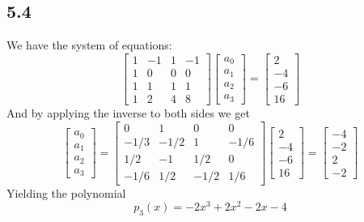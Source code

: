\documentclass[letterpaper,12pt]{article}
\theoremstyle{definition}
\begin{document}
\subsection*{5.4}
We have the system of equations:
\[
\begin{bmatrix}
    1 & -1 & 1 & -1 \\
    1 & 0 & 0 & 0 \\
    1 & 1 & 1 & 1 \\
    1 & 2 & 4 & 8
\end{bmatrix}
\begin{bmatrix}
    a_0 \\ a_1 \\ a_2 \\ a_3
\end{bmatrix}
=
\begin{bmatrix}
    2 \\ -4 \\ -6 \\ 16
\end{bmatrix}
\]
And by applying the inverse to both sides we get
\[
\begin{bmatrix}
    a_0 \\ a_1 \\ a_2 \\ a_3
\end{bmatrix}
=
\begin{bmatrix}
    0 & 1 & 0 & 0 \\
    -1/3 & -1/2 & 1 & -1/6 \\
    1/2 & -1 & 1/2 & 0 \\
    -1/6 & 1/2 & -1/2 & 1/6
\end{bmatrix}
\begin{bmatrix}
    2 \\ -4 \\ -6 \\ 16
\end{bmatrix}
=
\begin{bmatrix}
    -4 \\ -2 \\ 2 \\ -2
\end{bmatrix}
\]
Yielding the polynomial 
\[p_3(x) = -2x^3 + 2x^2 - 2x -4\]
\end{document}
